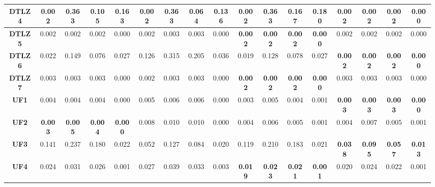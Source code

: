 \begin{table*}[t]
\begin{scriptsize}
\begin{tabular}{cc|c|c|c|c|c|c|c|c|c|c|c|c|c|c|c}
\multicolumn{1}{c|}{\textbf{DTLZ4}} & 0.002          & 0.363          & 0.105          & 0.163          & 0.002          & 0.363          & 0.064          & 0.136          & 0.002          & 0.363          & 0.167          & 0.180          & \textbf{0.002} & \textbf{0.002} & \textbf{0.002} & \textbf{0.000} \\ \hline
\multicolumn{1}{c|}{\textbf{DTLZ5}} & 0.002          & 0.002          & 0.002          & 0.000          & 0.002          & 0.003          & 0.003          & 0.000          & \textbf{0.002} & \textbf{0.002} & \textbf{0.002} & \textbf{0.000} & 0.002          & 0.002          & 0.002          & 0.000          \\ \hline
\multicolumn{1}{c|}{\textbf{DTLZ6}} & 0.022          & 0.149          & 0.076          & 0.027          & 0.126          & 0.315          & 0.205          & 0.036          & 0.019          & 0.128          & 0.078          & 0.027          & \textbf{0.002} & \textbf{0.002} & \textbf{0.002} & \textbf{0.000} \\ \hline
\multicolumn{1}{c|}{\textbf{DTLZ7}} & 0.003          & 0.003          & 0.003          & 0.000          & 0.002          & 0.003          & 0.003          & 0.000          & \textbf{0.002} & \textbf{0.002} & \textbf{0.002} & \textbf{0.000} & 0.003          & 0.003          & 0.003          & 0.000          \\ \hline
\multicolumn{1}{c|}{\textbf{UF1}}   & 0.004          & 0.004          & 0.004          & 0.000          & 0.005          & 0.006          & 0.006          & 0.000          & 0.003          & 0.005          & 0.004          & 0.001          & \textbf{0.003} & \textbf{0.003} & \textbf{0.003} & \textbf{0.000} \\ \hline
\multicolumn{1}{c|}{\textbf{UF2}}   & \textbf{0.003} & \textbf{0.005} & \textbf{0.004} & \textbf{0.000} & 0.008          & 0.010          & 0.010          & 0.000          & 0.004          & 0.006          & 0.005          & 0.001          & 0.004          & 0.007          & 0.005          & 0.001          \\ \hline
\multicolumn{1}{c|}{\textbf{UF3}}   & 0.141          & 0.237          & 0.180          & 0.022          & 0.052          & 0.127          & 0.084          & 0.020          & 0.119          & 0.210          & 0.183          & 0.021          & \textbf{0.038} & \textbf{0.095} & \textbf{0.057} & \textbf{0.013} \\ \hline
\multicolumn{1}{c|}{\textbf{UF4}}   & 0.024          & 0.031          & 0.026          & 0.001          & 0.027          & 0.039          & 0.033          & 0.003          & \textbf{0.019} & \textbf{0.023} & \textbf{0.021} & \textbf{0.001} & 0.020          & 0.024          & 0.022          & 0.001          \\ \hline

\end{tabular}
\end{scriptsize}
\end{table*}
